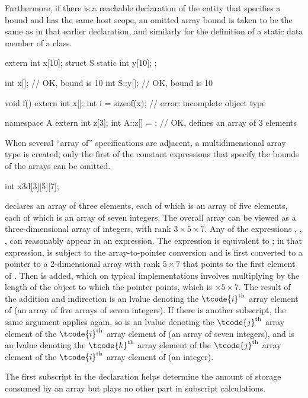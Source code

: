 \pnum
Furthermore, if there is a reachable declaration of the entity
that specifies a bound and
has the same host scope,
an omitted array bound is taken to
be the same as in that earlier declaration, and similarly for the definition
of a static data member of a class.
\begin{example}
\begin{codeblock}
extern int x[10];
struct S {
  static int y[10];
};

int x[];                // OK, bound is 10
int S::y[];             // OK, bound is 10

void f() {
  extern int x[];
  int i = sizeof(x);    // error: incomplete object type
}

namespace A { extern int z[3]; }
int A::z[] = {};        // OK, defines an array of 3 elements
\end{codeblock}
\end{example}

\pnum
{}%
\begin{note}
When several ``array of'' specifications are adjacent,
a multidimensional array type is created;
only the first of the constant expressions
that specify the bounds of the arrays can be omitted.
\begin{example}
\begin{codeblock}
int x3d[3][5][7];
\end{codeblock}
declares an array of three elements,
each of which is an array of five elements,
each of which is an array of seven integers.
The overall array can be viewed as a
three-dimensional array of integers,
with rank $3 \times 5 \times 7$.
Any of the expressions
,
,
,
can reasonably appear in an expression.
The expression
is equivalent to
;
in that expression,
is subject to the array-to-pointer conversion
and is first converted to
a pointer to a 2-dimensional
array with rank
$5 \times 7$
that points to the first element of .
Then  is added,
which on typical implementations involves multiplying
 by the
length of the object to which the pointer points,
which is $ \times 5 \times 7$.
The result of the addition and indirection is
an lvalue denoting
the $\tcode{i}^\text{th}$ array element of
(an array of five arrays of seven integers).
If there is another subscript,
the same argument applies again, so
 is
an lvalue denoting
the $\tcode{j}^\text{th}$ array element of
the $\tcode{i}^\text{th}$ array element of
(an array of seven integers), and
 is
an lvalue denoting
the $\tcode{k}^\text{th}$ array element of
the $\tcode{j}^\text{th}$ array element of
the $\tcode{i}^\text{th}$ array element of
(an integer).
\end{example}
The first subscript in the declaration helps determine
the amount of storage consumed by an array
but plays no other part in subscript calculations.
\end{note}

